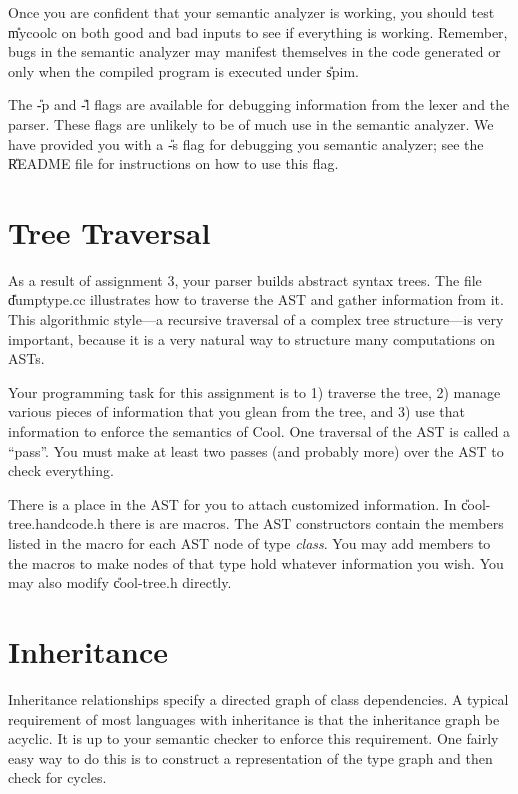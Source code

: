 Once you are confident that your semantic analyzer is working, you
should test \U{mycoolc} on both good and bad inputs to see if everything 
is working.
Remember, bugs in the semantic analyzer may manifest themselves in the
code generated or only when the compiled program is executed under
\U{spim}.

The \U{-p} and \U{-l} flags are available for debugging information
from the lexer and the parser.  These flags are unlikely to be of much
use in the semantic analyzer.  We have provided you with a \U{-s} flag
for debugging you semantic analyzer; see the \U{README} file for instructions
on how to use this flag.

\section{Tree Traversal}

As a result of assignment 3, your parser builds abstract syntax trees.
The file \U{dumptype.cc} illustrates how to traverse the AST and gather
information from it. This algorithmic style---a recursive traversal of
a complex tree structure---is very important, because it is a very natural
way to structure many computations on ASTs.

Your programming task for this assignment is to
1) traverse the tree, 2) manage various pieces of information that you
glean from the tree, and 3) use that information to enforce the
semantics of Cool.  One traversal of the AST is called a ``pass''.
You must make at least two passes (and probably more) over the
AST to check everything.

There is a place in the AST for you to attach customized information. In
\U{cool-tree.handcode.h} there is are  macros.
The AST constructors contain the members listed in the 
macro for each AST node of type {\em class}.  You may add members to the macros
to make nodes of that type hold whatever information you wish. You may 
also modify \U{cool-tree.h} directly.

\section{Inheritance}

Inheritance relationships specify a directed graph of class
dependencies.  A typical requirement of most languages with
inheritance is that the inheritance graph be acyclic.
It is up to your semantic checker to enforce this requirement. One
fairly easy way to do this is to construct a representation of the
type graph and then check for cycles.

